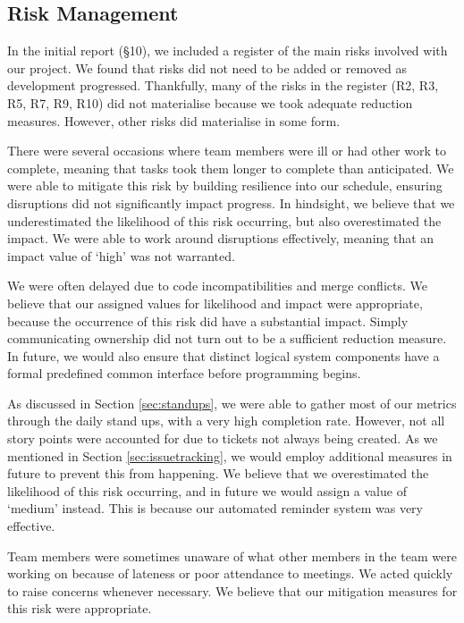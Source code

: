 \subsection{Risk Management}
In the initial report (§10), we included a register of the main risks involved with our project.  We found that risks did not need to be added or removed as development progressed. Thankfully, many of the risks in the register (R2, R3, R5, R7, R9, R10) did not materialise because we took adequate reduction measures. However, other risks did materialise in some form. 
\begin{description}[topsep=3pt, itemsep=2pt]
	\item[R1: Unavailability of Team Members] There were several occasions where team members were ill or had other work to complete, meaning that tasks took them longer to complete than anticipated. We were able to mitigate this risk by building resilience into our schedule, ensuring disruptions did not significantly impact progress. In hindsight, we believe that we underestimated the likelihood of this risk occurring, but also overestimated the impact. We were able to work around disruptions effectively, meaning that an impact value of `high’ was not warranted.
	\item[R4: Incompatibilities and Merge Conflcits] We were often delayed due to code incompatibilities and merge conflicts. We believe that our assigned values for likelihood and impact were appropriate, because the occurrence of this risk did have a substantial impact. Simply communicating ownership did not turn out to be a sufficient reduction measure. In future, we would also ensure that distinct logical system components have a formal predefined common interface before programming begins.
	\item[R6: Collection of Metrics] As discussed in Section \ref{sec:standups}, we were able to gather most of our metrics through the daily stand ups, with a very high completion rate. However, not all story points were accounted for due to tickets not always being created. As we mentioned in Section \ref{sec:issuetracking}, we would employ additional measures in future to prevent this from happening. We believe that we overestimated the likelihood of this risk occurring, and in future we would assign a value of `medium’ instead. This is because our automated reminder system was very effective.
	\item[R8: Lateness to Meetings] Team members were sometimes unaware of what other members in the team were working on because of lateness or poor attendance to meetings. We acted quickly to raise concerns whenever necessary. We believe that our mitigation measures for this risk were appropriate. 
\end{description}
